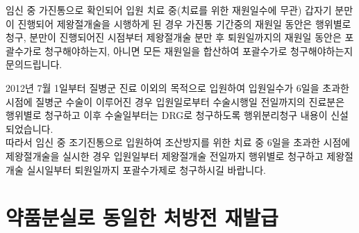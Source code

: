 임신 중 가진통으로 확인되어 입원 치료 중(치료를 위한 재원일수에 무관) 갑자기 분만이 진행되어 제왕절개술을 시행하게 된 경우 가진통 기간중의 재원일 동안은 행위별로 청구, 분만이 진행되어진 시점부터 제왕절개술 분만 후 퇴원일까지의 재원일 동안은 포괄수가로 청구해야하는지, 아니면 모든 재원일을 합산하여 포괄수가로 청구해야하는지 문의드립니다.
\begin{quotebox}
2012년 7월 1일부터 질병군 진료 이외의 목적으로 입원하여 입원일수가 6일을 초과한 시점에 질병군 수술이 이루어진 경우 입원일로부터 수술시행일 전일까지의 진료분은 행위별로 청구하고 이후 수술일부터는 DRG로 청구하도록 행위 분리청구 내용이 신설되었습니다.\\
따라서 임신 중 조기진통으로 입원하여 조산방지를 위한 치료 중 6일을 초과한 시점에 제왕절개술을 실시한 경우 입원일부터 제왕절개술 전일까지 행위별로 청구하고 제왕절개술 실시일부터 퇴원일까지 포괄수가제로 청구하시길 바랍니다. 
\end{quotebox}

\clearpage
\section{약품분실로 동일한 처방전 재발급}
